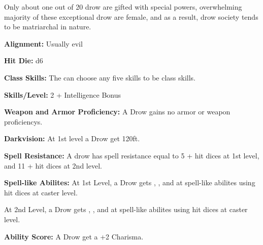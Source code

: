 
Only about one out of 20 drow are gifted with special powers, overwhelming majority of these exceptional drow are female, and as a result, drow society tends to be matriarchal in nature.

\textbf{Alignment:} Usually evil

\textbf{Hit Die:} d6

\textbf{Class Skills:} The \currentclassname{} can choose any five skills to be class skills.

\textbf{Skills/Level:} 2 + Intelligence Bonus

\modebab{}
\poorfor{}
\goodref{}
\poorwil{}

\begin{classtable}
\end{classtable}

\classfeatures

\textbf{Weapon and Armor Proficiency:} A Drow gains no armor or weapon proficiencys.

\textbf{Darkvision:} At 1st level a Drow get  120ft.

\textbf{Spell Resistance:} A drow has spell resistance equal to 5 + hit dices at 1st level, and 11 + hit dices at 2nd level.

\textbf{Spell-like Abilites:} At 1st Level, a Drow gets , , and  at spell-like abilites using hit dices at caster level.

At 2nd Level, a Drow gets , , and  at spell-like abilites using hit dices at caster level.

\textbf{Ability Score:} A Drow get a +2 Charisma.


